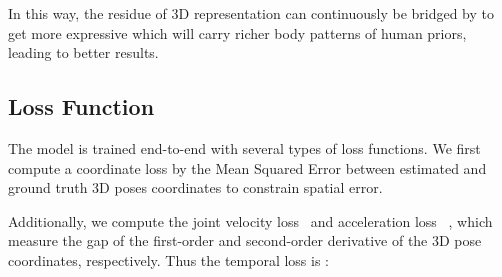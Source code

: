 \documentclass{article}
\begin{document}
In this way, the residue of 3D representation can continuously be bridged by  to get more expressive  which will carry richer body patterns of human priors, leading to better results.
\fi

\vspace{-0.5em}











\subsection{Loss Function}The model is trained end-to-end with several types of loss functions. We first compute a coordinate loss  by the Mean Squared Error between estimated and ground truth 3D poses coordinates to constrain spatial error.
\iffalse

where  is the ground-truth 3d coordinates. 
\fi
Additionally, we compute the joint velocity loss~\cite{pavllo20193d}  and acceleration loss~\cite{xu20213d} , which measure the gap of the first-order and second-order derivative of the 3D pose coordinates, respectively. 
\iffalse
Thus the temporal loss is :
\end{document}
